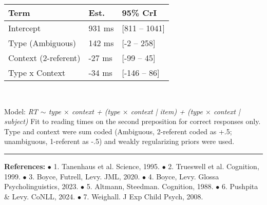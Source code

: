 \documentclass[11pt,a4paper]{article}
\begin{document}
	\begin{minipage}{.48\textwidth}
		\begin{small}
			\begin{tabular}{|l|l|l|}
				\hline
				Term & Est. & 95\% CrI \\
				\hline
				Intercept & 931 ms & [811 -- 1041] \\
				Type (Ambiguous) & 142 ms & [-2 -- 258] \\
				Context (2-referent) & -27 ms & [-99 -- 45] \\
				Type x Context & -34 ms  & [-146 -- 86] \\
				\hline
			\end{tabular}
		\end{small}
	\end{minipage}
	~~
	\begin{minipage} {.5\textwidth}\begin{small}
			Model: \textit{RT $\sim$ type $\times$ context + (type $\times$ context | item) + (type $\times$ context | subject)}
			Fit to reading times on the second preposition for correct responses only. Type and context were sum coded (Ambiguous, 2-referent coded as +.5; unambiguous, 1-referent as -.5) and weakly regularizing priors were used. 
			
		\end{small}
	\end{minipage}
	
	\vspace{5pt}
	\rule{\textwidth}{1pt}
	
	
	\begin{minipage}{\textwidth}
		\vspace{5pt}
		\begin{small} \textbf{References:} $\bullet$	
			1. Tanenhaus et al. Science, 1995. $\bullet$
			2. Trueswell et al. Cognition, 1999. $\bullet$
			3. Boyce, Futrell, Levy. JML, 2020. $\bullet$
			4. Boyce, Levy. Glossa Psycholinguistics, 2023. $\bullet$
			5. Altmann, Steedman. Cognition, 1988. $\bullet$
			6. Pushpita \& Levy. CoNLL, 2024. $\bullet$
			7. Weighall. J Exp Child Psych, 2008.
		\end{small}
	\end{minipage}
	
	
\end{document}

